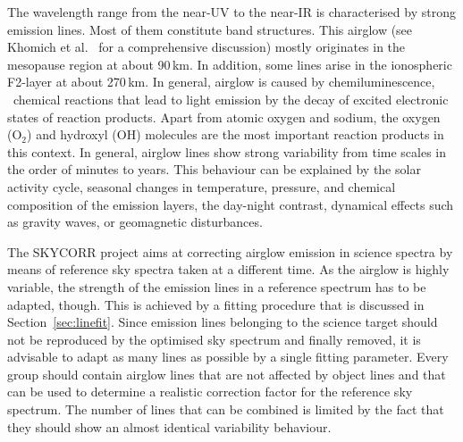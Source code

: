 The wavelength range from the near-UV to the near-IR is characterised by strong
emission lines. Most of them constitute band structures. This airglow (see
Khomich et al.~\cite{KHO08} for a comprehensive discussion) mostly originates
in the mesopause region at about 90\,km. In addition, some lines arise in the
ionospheric F2-layer at about 270\,km. In general, airglow is caused by
chemiluminescence, \ie\ chemical reactions that lead to light emission by the
decay of excited electronic states of reaction products. Apart from atomic
oxygen and sodium, the oxygen (O$_2$) and hydroxyl (OH) molecules are the most
important reaction products in this context. In general, airglow lines show
strong variability from time scales in the order of minutes to years. This
behaviour can be explained by the solar activity cycle, seasonal changes in
temperature, pressure, and chemical composition of the emission layers, the
day-night contrast, dynamical effects such as gravity waves, or geomagnetic
disturbances.

The SKYCORR project aims at correcting airglow emission in science spectra by
means of reference sky spectra taken at a different time. As the airglow is
highly variable, the strength of the emission lines in a reference spectrum has
to be adapted, though. This is achieved by a fitting procedure that is
discussed in Section~\ref{sec:linefit}. Since emission lines belonging to the
science target should not be reproduced by the optimised sky spectrum and
finally removed, it is advisable to adapt as many lines as possible by a
single fitting parameter. Every group should contain airglow lines that are not
affected by object lines and that can be used to determine a realistic
correction factor for the reference sky spectrum. The number of lines that can
be combined is limited by the fact that they should show an almost identical
variability behaviour.


